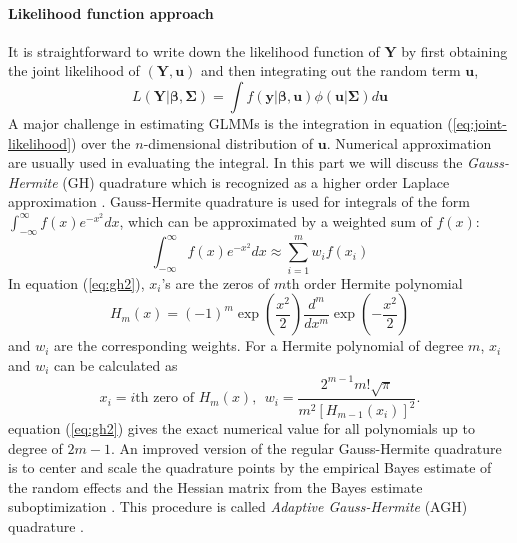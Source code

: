 \paragraph{Likelihood function approach}\label{para:likelihood-approach}
It is straightforward  to write down the likelihood function of $\bm Y$ by first obtaining the
joint likelihood of $(\bm Y, \bm u)$ and then integrating out the random term $\bm u$,
\begin{equation}\label{eq:joint-likelihood}
	L(\bm Y|\bm\beta, \bm \Sigma) = \int f(\bm y|\bm \beta, \bm u)\phi(\bm u|\bm \Sigma)d \bm u
\end{equation}
A major challenge in estimating GLMMs is the integration in equation (\ref{eq:joint-likelihood})
over the $n$-dimensional distribution of $\bm u$. Numerical approximation are usually used in
evaluating the integral. In this part we will discuss the \textit{Gauss-Hermite} (GH) quadrature
which is recognized as a higher order Laplace approximation \citep{liu1994note}.
Gauss-Hermite quadrature is used for integrals of the form 
$\int_{-\infty}^{\infty}f(x) e^{-x^2}dx$, which can be approximated by a weighted sum of  $f(x)$:
\begin{equation}\label{eq:gh2}
	\int_{-\infty}^{\infty}f(x) e^{-x^2}dx \approx \sum_{i=1}^m w_if(x_i)
\end{equation}
In equation (\ref{eq:gh2}), $x_i$'s are the zeros of $m$th order Hermite polynomial 
\[H_m(x) = (-1)^m\exp(\dfrac{x^2}{2})\frac{d^m}{dx^m}\exp(-\dfrac{x^2}{2})\]
and $w_i$ are the corresponding weights. For a Hermite polynomial of degree $m$, $x_i$ and $w_i$
can be calculated as 	
\begin{equation}\label{eq:gh3}
	x_i = i\text{th zero of } H_m(x),~~  w_i = \frac{2^{m-1}m!\sqrt{\pi}}{m^2[H_{m-1}(x_i)]^2}. 
\end{equation}
equation (\ref{eq:gh2}) gives the exact numerical value for all polynomials up to degree of
$2m-1$. 
An improved version of the regular Gauss-Hermite quadrature is to center and scale the quadrature
points  by the empirical Bayes estimate of the random effects and the Hessian matrix from the Bayes
estimate suboptimization \citep{liu1994note}. This procedure is called \textit{Adaptive
	Gauss-Hermite} (AGH) quadrature \citep{pinheiro1995approximations}. %


